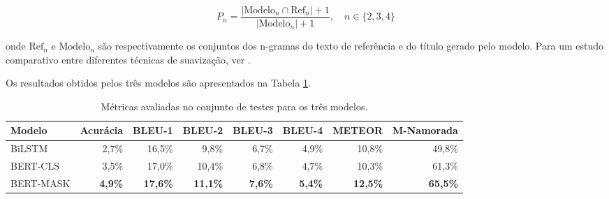 \documentclass{article}
\begin{document}
\begin{equation}
P_n = \frac{|\text{Modelo}_n \cap \text{Ref}_n| + 1}{|\text{Modelo}_n| + 1}, \quad n \in \{2, 3, 4\}
\end{equation}

\noindent onde $\text{Ref}_n$ e $\text{Modelo}_n$ são respectivamente os conjuntos dos n-gramas do texto de referência e do título gerado pelo modelo. Para um estudo comparativo entre diferentes técnicas de suavização, ver \textcite{chen2014systematic}.


Os resultados obtidos pelos três modelos são apresentados na Tabela \ref{table:results}.

\begin{table}[h!]
	\centering
	\begin{tabular}{@{}lrrrrrrr@{}}
		\toprule
		Modelo &
		\multicolumn{1}{l}{Acurácia} &
		\multicolumn{1}{l}{BLEU-1} &
		\multicolumn{1}{l}{BLEU-2} &
		\multicolumn{1}{l}{BLEU-3} &
		\multicolumn{1}{l}{BLEU-4} &
		\multicolumn{1}{l}{METEOR} &
		\multicolumn{1}{l}{M-Namorada} \\ \midrule
		BiLSTM    & 2,7\%          & 16,5\%          & 9,8\%           & 6,7\%          & 4,9\%          & 10,8\%          & 49,8\%          \\
		BERT-CLS  & 3,5\%          & 17,0\%          & 10,4\%          & 6,8\%          & 4,7\%          & 10,3\%          & 61,3\%          \\
		BERT-MASK & \textbf{4,9\%} & \textbf{17,6\%} & \textbf{11,1\%} & \textbf{7,6\%} & \textbf{5,4\%} & \textbf{12,5\%} & \textbf{65,5\%} \\ \bottomrule
	\end{tabular}
	\caption{Métricas avaliadas no conjunto de testes para os três modelos.}
	\label{table:results}
\end{table}

\printbibliography
\end{document}
